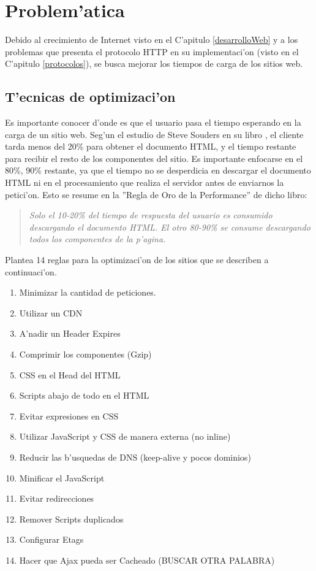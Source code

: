 \chapter{Problem'atica}

Debido al crecimiento de Internet visto en el C'apitulo \ref{desarrolloWeb} y a los problemas que presenta el protocolo HTTP en su implementaci'on (visto en el C'apitulo \ref{protocolos}), se busca mejorar los tiempos de carga de los sitios web. 


\section{T'ecnicas de optimizaci'on}

Es importante conocer d'onde es que el usuario pasa el tiempo esperando en la carga de un sitio web. Seg'un el estudio de Steve Souders en su libro \citep{highPerformanceWebSites}, el cliente tarda menos del 20\% para obtener el documento HTML, y el tiempo restante para recibir el resto de los componentes del sitio. Es importante enfocarse en el 80\%, 90\% restante, ya que el tiempo no se desperdicia en descargar el documento HTML ni en el procesamiento que realiza el servidor antes de enviarnos la petici'on. Esto se resume en la ''Regla de Oro de la Performance'' de dicho libro:

\begin{quote}

\textit{Solo el 10-20\% del tiempo de respuesta del usuario es consumido descargando el documento HTML. El otro 80-90\% se consume descargando todos los componentes de la p'agina.}

\end{quote}

Plantea 14 reglas para la optimizaci'on de los sitios que se describen a continuaci'on.

\begin{enumerate}

\item Minimizar la cantidad de peticiones.
\item Utilizar un CDN
\item A'nadir un Header Expires
\item Comprimir los componentes (Gzip)
\item CSS en el Head del HTML
\item Scripts abajo de todo en el HTML
\item Evitar expresiones en CSS
\item Utilizar JavaScript y CSS de manera externa (no inline)
\item Reducir las b'usquedas de DNS (keep-alive y pocos dominios)
\item Minificar el JavaScript
\item Evitar redirecciones
\item Remover Scripts duplicados
\item Configurar Etags
\item Hacer que Ajax pueda ser Cacheado (BUSCAR OTRA PALABRA)

\end{enumerate}